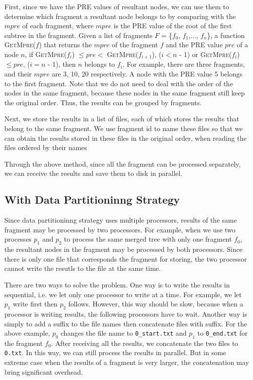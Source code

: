 First, since we have the PRE values of resultant nodes, we can use them to
determine which fragment a resultant node belongs to by comparing with the
$mpre$ of each fragment, where $mpre$ is the PRE value of the root of the first
subtree in the fragment. Given a list of fragments $F$ = \{$f_0$, $f_1$,...,
$f_n$\}, a function \textsc{GetMpre($f$)} that returns the $mpre$ of the
fragment $f$ and the PRE value $pre$ of a node $n$, if \textsc{GetMpre($f_i$)}
$\leq pre <$ \textsc{GetMpre($f_{i+1}$)}, ($i  < n$ - 1) or
\textsc{GetMpre($f_i$)}$\leq pre$, ($i = n$ - 1), then $n$ belongs to $f_i$. For
example, there are three fragments, and their $mpre$ are 3, 10, 20 respectively.
A node with the PRE value 5 belongs to the first fragment. Note that we do not
need to deal with the order of the nodes in the same fragment, because these
nodes in the same fragment still keep the original order. Thus, the results can
be grouped by fragments.

Next, we store the results in a list of files, each of which stores the results
that belong to the same fragment. We use fragment id to name these files so
that we can obtain the results stored in these files in the original order, when
reading the files ordered by their names

Through the above method, since all the fragment can be processed separately, we
can receive the results and save them to disk in parallel.

\subsection{With Data Partitioninng Strategy}

Since data partitioninng strategy uses multiple processors, results of the same
fragment may be processed by two processors. For example, when we use two
processes $p_1$ and $p_2$ to process the same merged tree with only one fragment
$f_0$, the resultant nodes in the fragment may be processed by both processors.
Since there is only one file that corresponds the fragment for storing, the two
processor cannot write the resutls to the file at the same time.

There are two ways to solve the problem. One way is to write the results in
sequential, i.e. we let only one processor to write at a time. For example, we
let $p_1$ write first then $p_2$ follows. However, this way should be slow, because
when a processor is writing results, the following processors have to wait.
Another way is simply to add a suffix to the file names then concatenate files
with suffix. For the above example, $p_0$ changes the file name to
\texttt{0\_start.txt} and $p_1$ to \texttt{0\_end.txt} for the fragment $f_0$.
After receiving all the results, we concatenate the two files to \texttt{0.txt}.
In this way, we can still process the results in parallel. But in some extreme
case when the results of a fragment is very larger, the concatenation may bring
significant overhead.



